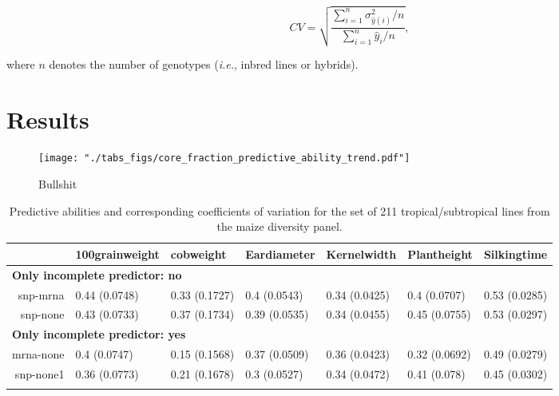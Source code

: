 \documentclass[]{elsarticle} %
\makeatletter
\def\maxwidth{\ifdim\Gin@nat@width>\linewidth\linewidth
\else\Gin@nat@width\fi}
\let\Oldincludegraphics\includegraphics
\renewcommand{\includegraphics}[1]{\Oldincludegraphics[width=\maxwidth]{#1}}
\makeatother
\begin{document}
\begin{equation}
  \label{eq:CV}
CV = \sqrt{\frac{\sum_{i = 1}^{n} \sigma^{2}_{\hat{y}(i)} / n}{\sum_{i=1}^{n}\hat{y}_{i} / n}},
\end{equation}

where \(n\) denotes the number of genotypes (\emph{i.e.}, inbred lines
or hybrids).

\section{Results}\label{results}

\begin{figure}[htbp]
\centering
\texttt{[image: "./tabs\_figs/core\_fraction\_predictive\_ability\_trend.pdf"]}
\caption{Bullshit}
\end{figure}

\begin{table}[ht]
\centering
\caption{Predictive abilities and corresponding coefficients of variation for the set of 211 tropical/subtropical lines from the maize diversity panel.} 
\begin{tabular}{rllllll}
  \toprule
 & 100grainweight & cobweight & Eardiameter & Kernelwidth & Plantheight & Silkingtime \\ 
  \midrule
\multicolumn{6}{l}{{\bfseries Only incomplete predictor: no}}\\
snp-mrna & 0.44 (0.0748) & 0.33 (0.1727) & 0.4 (0.0543) & 0.34 (0.0425) & 0.4 (0.0707) & 0.53 (0.0285) \\ 
  snp-none & 0.43 (0.0733) & 0.37 (0.1734) & 0.39 (0.0535) & 0.34 (0.0455) & 0.45 (0.0755) & 0.53 (0.0297) \\ 
   \midrule
\multicolumn{6}{l}{{\bfseries Only incomplete predictor: yes}}\\
mrna-none & 0.4 (0.0747) & 0.15 (0.1568) & 0.37 (0.0509) & 0.36 (0.0423) & 0.32 (0.0692) & 0.49 (0.0279) \\ 
  snp-none1 & 0.36 (0.0773) & 0.21 (0.1678) & 0.3 (0.0527) & 0.34 (0.0472) & 0.41 (0.078) & 0.45 (0.0302) \\ 
   \bottomrule
\multicolumn{6}{l}{}\\
\end{tabular}
\end{table}
\end{document}
